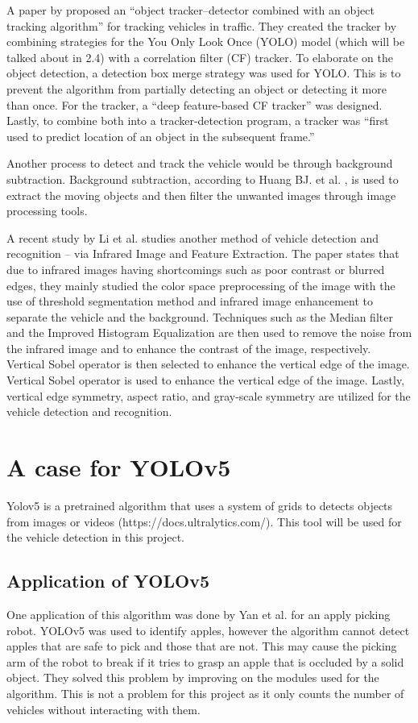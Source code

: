 	A paper by \cite{yang_2020} proposed an “object tracker–detector combined with an object tracking algorithm” for tracking vehicles in traffic. They created the tracker by combining strategies for the You Only Look Once (YOLO) model (which will be talked about in 2.4) with a correlation filter (CF) tracker. To elaborate on the object detection, a detection box merge strategy was used for YOLO. This is to prevent the algorithm from partially detecting an object or detecting it more than once. For the tracker, a “deep feature-based CF tracker” was designed. Lastly, to combine both into a tracker-detection program, a tracker was “first used to predict location of an object in the subsequent frame.”

	Another process to detect and track the vehicle would be through background subtraction. Background subtraction, according to Huang BJ. et al. \citeyear{Huang_2017}, is used to extract the moving objects and then filter the unwanted images through image processing tools. 
	
	A recent study by Li et al. \citeyear{li_2022} studies another method of vehicle detection and recognition – via Infrared Image and Feature Extraction. The paper states that due to infrared images having shortcomings such as poor contrast or blurred edges, they mainly studied the color space preprocessing of the image with the use of threshold segmentation method and infrared image enhancement to separate the vehicle and the background. Techniques such as the Median filter and the Improved Histogram Equalization are then used to remove the noise from the infrared image and to enhance the contrast of the image, respectively. Vertical Sobel operator is then selected to enhance the vertical edge of the image. Vertical Sobel operator is used to enhance the vertical edge of the image. Lastly, vertical edge symmetry, aspect ratio, and gray-scale symmetry are utilized for the vehicle detection and recognition.


\section{A case for YOLOv5}
	Yolov5 is a pretrained algorithm that uses a system of grids to detects objects from images or videos (https://docs.ultralytics.com/). This tool will be used for the vehicle detection in this project. 

\subsection{Application of YOLOv5}
One application of this algorithm was done by Yan et al. \citeyear{yan_2021} for an apply picking robot. YOLOv5 was used to identify apples, however the algorithm cannot detect apples that are safe to pick and those that are not. This may cause the picking arm of the robot to break if it tries to grasp an apple that is occluded by a solid object. They solved this problem by improving on the modules used for the algorithm. This is not a problem for this project as it only counts the number of vehicles without interacting with them. 

